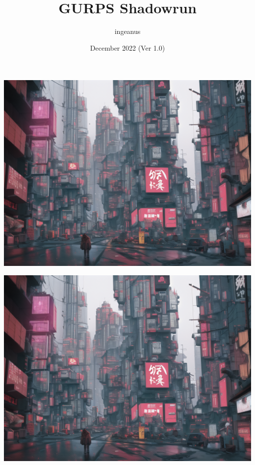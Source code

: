\documentclass{article}
\title{GURPS Shadowrun}
\author{ingeanus}
\date{December 2022 (Ver 1.0)}
\begin{document}
	
	\maketitle
	
	\tableofcontents
	
	\newpage
	\includegraphics*[viewport = 0 0 512 768]{cover_image.png}
	
	\includegraphics*[viewport = 512 0 1024 768]{cover_image.png}
	
	
	
	\newpage
	
	
	\newpage
	
	
\end{document}
